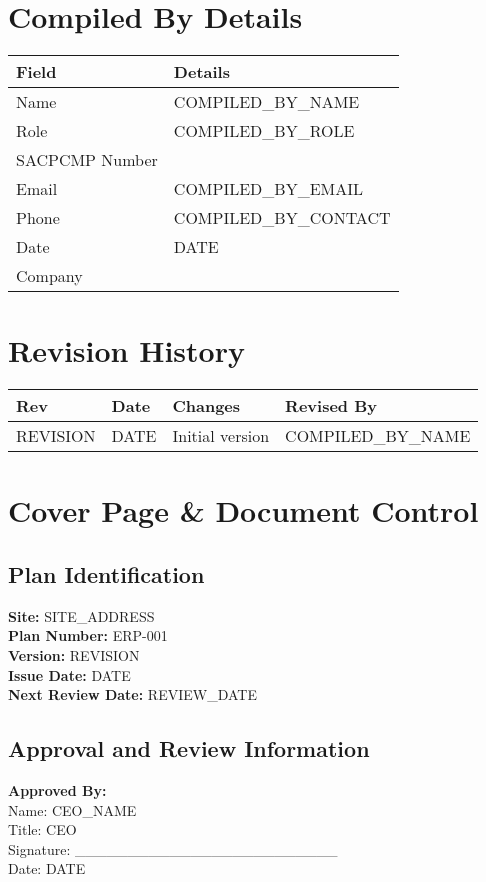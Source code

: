 \documentclass[11pt]{article}
\newcommand{\refNumber}{ERP-001}
\newcommand{\issueDate}{{{DATE}}}
\newcommand{\compilerName}{{{COMPILED_BY_NAME}}}
\newcommand{\compilerRole}{{{COMPILED_BY_ROLE}}}
\newcommand{\compilerSACPCMP}{}
\newcommand{\compilerEmail}{{{COMPILED_BY_EMAIL}}}
\newcommand{\compilerPhone}{{{COMPILED_BY_CONTACT}}}
\newcommand{\compilerCompany}{}
\newcommand{\revision}{{{REVISION}}}
\newcommand{\reviewDate}{{{REVIEW_DATE}}}
\newcommand{\siteAddress}{{{SITE_ADDRESS}}}
\begin{document}
\section{Compiled By Details}
\begin{tabularx}{\textwidth}{lX}
  \toprule
  \textbf{Field} & \textbf{Details} \\
  \midrule
  Name & \compilerName \\
  Role & \compilerRole \\
  SACPCMP Number & \compilerSACPCMP \\
  Email & \compilerEmail \\
  Phone & \compilerPhone \\
  Date & \issueDate \\
  Company & \compilerCompany \\
  \bottomrule
\end{tabularx}

\section{Revision History}
\begin{tabularx}{\textwidth}{lXll}
  \toprule
  \textbf{Rev} & \textbf{Date} & \textbf{Changes} & \textbf{Revised By} \\
  \midrule
  \revision & \issueDate & Initial version & \compilerName \\
  \bottomrule
\end{tabularx}

\section{Cover Page \& Document Control}

\subsection{Plan Identification}
\textbf{Site:} \siteAddress \\
\textbf{Plan Number:} \refNumber \\
\textbf{Version:} \revision \\
\textbf{Issue Date:} \issueDate \\
\textbf{Next Review Date:} \reviewDate

\subsection{Approval and Review Information}
\textbf{Approved By:}\\
Name: {{CEO_NAME}}\\
Title: CEO\\
Signature: _________________________\\
Date: \issueDate
\end{document}
